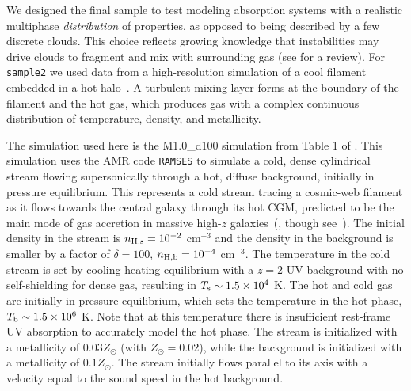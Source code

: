 \documentclass[fleqn,usenatbib]{mnras}
\begin{document}
We designed the final sample to test modeling absorption systems with a realistic multiphase \textit{distribution} of properties, as opposed to being described by a few discrete clouds.
This choice reflects growing knowledge that instabilities may drive clouds to fragment and mix with surrounding gas (see \citealt{faucher-giguere2023Key} for a review).
For \texttt{sample2} we used data from a high-resolution simulation of a cool filament embedded in a hot halo~\citep{mandelker2020Instability}.
A turbulent mixing layer forms at the boundary of the filament and the hot gas, which produces gas with a complex continuous distribution of temperature, density, and metallicity.

The simulation used here is the M1.0\_d100 simulation from Table 1 of \cite{mandelker2020Instability}.
This simulation uses the AMR code \texttt{RAMSES} \citep{teyssier2002Cosmological} to simulate a cold, dense cylindrical stream flowing supersonically through a hot, diffuse background, initially in pressure equilibrium.
This represents a cold stream tracing a cosmic-web filament as it flows towards the central galaxy through its hot CGM, predicted to be the main mode of gas accretion in massive high-$z$ galaxies~(\citealt{keres2009Galaxies, dekel2009Cold}, though see~\citealt{nelson2013Moving}).
The initial density in the stream is $n_{\rm H,s}=10^{-2}$ cm$^{-3}$ and the density in the background is smaller by a factor of $\delta=100$, $n_{\rm H,b}=10^{-4}$ cm$^{-3}$.
The temperature in the cold stream is set by cooling-heating equilibrium with a $z=2$ \cite{haardt1996Radiative} UV background with no self-shielding for dense gas, resulting in $T_{\rm s}\sim 1.5 \times 10^4$ K.
The hot and cold gas are initially in pressure equilibrium, which sets the temperature in the hot phase, $T_{\rm b}\sim 1.5 \times 10^6$ K.
Note that at this temperature there is insufficient rest-frame UV absorption to accurately model the hot phase.
The stream is initialized with a metallicity of $0.03 Z_\odot$ (with $Z_\odot = 0.02$), while the background is initialized with a metallicity of $0.1 Z_\odot$.
The stream initially flows parallel to its axis with a velocity equal to the sound speed in the hot background.
\end{document}
